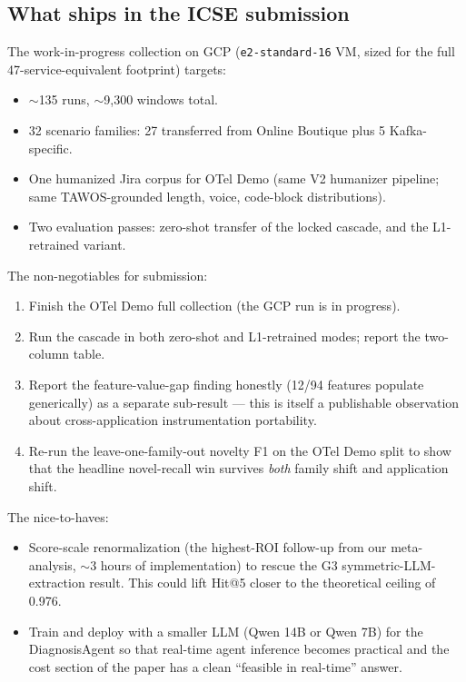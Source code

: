 \subsection{What ships in the ICSE submission}

The work-in-progress collection on GCP (\texttt{e2-standard-16} VM, sized for the full 47-service-equivalent footprint) targets:

\begin{itemize}
\item $\sim$135 runs, $\sim$9{,}300 windows total.
\item 32 scenario families: 27 transferred from Online Boutique plus 5 Kafka-specific.
\item One humanized Jira corpus for OTel Demo (same V2 humanizer pipeline; same TAWOS-grounded length, voice, code-block distributions).
\item Two evaluation passes: zero-shot transfer of the locked cascade, and the L1-retrained variant.
\end{itemize}

The non-negotiables for submission:

\begin{enumerate}
\item Finish the OTel Demo full collection (the GCP run is in progress).
\item Run the cascade in both zero-shot and L1-retrained modes; report the two-column table.
\item Report the feature-value-gap finding honestly (12/94 features populate generically) as a separate sub-result --- this is itself a publishable observation about cross-application instrumentation portability.
\item Re-run the leave-one-family-out novelty F1 on the OTel Demo split to show that the headline novel-recall win survives \emph{both} family shift and application shift.
\end{enumerate}

The nice-to-haves:

\begin{itemize}
\item Score-scale renormalization (the highest-ROI follow-up from our meta-analysis, $\sim$3 hours of implementation) to rescue the G3 symmetric-LLM-extraction result. This could lift Hit@5 closer to the theoretical ceiling of 0.976.
\item Train and deploy with a smaller LLM (Qwen 14B or Qwen 7B) for the DiagnosisAgent so that real-time agent inference becomes practical and the cost section of the paper has a clean ``feasible in real-time'' answer.
\end{itemize}

